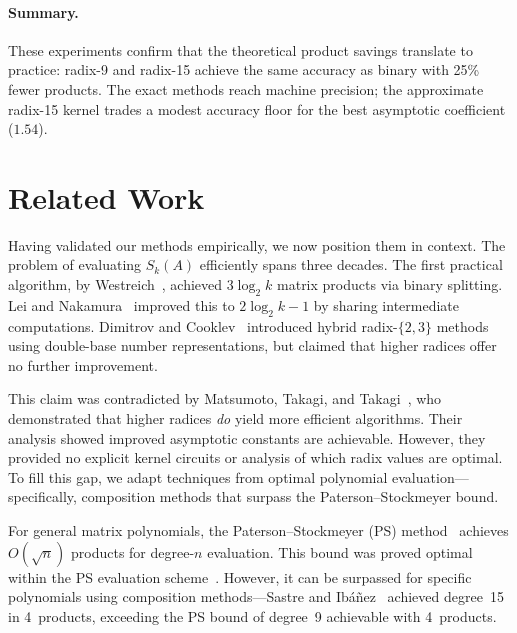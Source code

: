 \documentclass[
  journal=largetwo,
  manuscript=article,
  manuscriptlabel={Research Preprint},
  logo=false,
  simfonts=false,
  year=2026,
  volume=1,
]{cup-journal}
\theoremstyle{definition}
\theoremstyle{remark}
\begin{document}
\paragraph{Summary.}
These experiments confirm that the theoretical product savings translate to
practice: radix-9 and radix-15 achieve the same accuracy as binary with
25\% fewer products.
The exact methods reach machine precision; the approximate radix-15 kernel
trades a modest accuracy floor for the best asymptotic coefficient ($1.54$).


\section{Related Work}
\label{sec:related}


Having validated our methods empirically, we now position them in context.
The problem of evaluating $S_k(A)$ efficiently spans three decades.
The first practical algorithm, by Westreich~\cite{westreich1989}, achieved
$3\log_2 k$ matrix products via binary splitting. Lei and Nakamura~\cite{lei1992}
improved this to $2\log_2 k - 1$ by sharing intermediate computations. Dimitrov
and Cooklev~\cite{dimitrov1995} introduced hybrid radix-$\{2,3\}$ methods using
double-base number representations, but claimed that higher radices offer no
further improvement.


This claim was contradicted by Matsumoto, Takagi, and Takagi~\cite{matsumoto2018},
who demonstrated that higher radices \emph{do} yield more efficient algorithms.
Their analysis showed improved asymptotic constants are achievable. However, they
provided no explicit kernel circuits or analysis of which radix values are optimal.
To fill this gap, we adapt techniques from optimal polynomial evaluation---specifically, composition methods that surpass the Paterson--Stockmeyer bound.


For general matrix polynomials, the Paterson--Stockmeyer (PS) method~\cite{paterson1973}
achieves $O(\sqrt{n})$ products for degree-$n$ evaluation.
This bound was proved optimal within the PS evaluation scheme~\cite{fasi2019}.
However, it can be surpassed for specific polynomials using composition methods---Sastre and Ib\'a\~nez~\cite{sastre2021} achieved degree~15 in 4~products, exceeding the PS bound of degree~9 achievable with 4~products.
\end{document}
